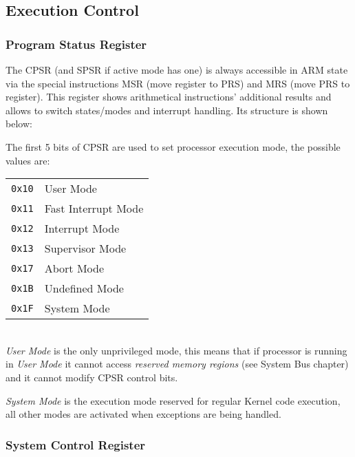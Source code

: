 

\subsection{Execution Control}

\subsubsection{Program Status Register}

The CPSR (and SPSR if active mode has one) is always accessible in ARM state via the special instructions MSR (move register to PRS) and MRS (move PRS to register). This register shows arithmetical instructions' additional results and allows to switch states/modes and interrupt handling. Its structure is shown below:

\vspace{5px}


The first 5 bits of CPSR are used to set processor execution mode, the possible values are:
\\

\begin{tabular}{r|l}
\texttt{0x10} & User Mode \\
\texttt{0x11} & Fast Interrupt Mode \\
\texttt{0x12} & Interrupt Mode \\
\texttt{0x13} & Supervisor Mode \\
\texttt{0x17} & Abort Mode \\
\texttt{0x1B} & Undefined Mode \\
\texttt{0x1F} & System Mode \\
\end{tabular}
\\

\emph{User Mode} is the only unprivileged mode, this means that if processor is running in \emph{User Mode} it cannot access \emph{reserved memory regions} (see System Bus chapter) and it cannot modify CPSR control bits.

\emph{System Mode} is the execution mode reserved for regular Kernel code execution, all other modes are activated when exceptions are being handled.

\subsubsection{System Control Register}

